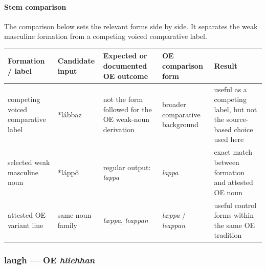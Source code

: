 \documentclass[
  british,
  a4paper,
]{article}
\newcounter{none} %
\begin{document}
\paragraph{Stem comparison}\label{stem-comparison-2}

The comparison below sets the relevant forms side by side. It separates
the weak masculine formation from a competing voiced comparative label.

{\def\LTcaptype{none} %
\begin{longtable}[]{@{}
  >{\raggedright\arraybackslash}p{}
  >{\raggedright\arraybackslash}p{}
  >{\raggedright\arraybackslash}p{}
  >{\raggedright\arraybackslash}p{}
  >{\raggedright\arraybackslash}p{}@{}}
\toprule\noalign{}
\begin{minipage}[b]{\linewidth}\raggedright
Formation / label
\end{minipage} & \begin{minipage}[b]{\linewidth}\raggedright
Candidate input
\end{minipage} & \begin{minipage}[b]{\linewidth}\raggedright
Expected or documented OE outcome
\end{minipage} & \begin{minipage}[b]{\linewidth}\raggedright
OE comparison form
\end{minipage} & \begin{minipage}[b]{\linewidth}\raggedright
Result
\end{minipage} \\
\midrule\noalign{}
\endhead
\bottomrule\noalign{}
\endlastfoot
competing voiced comparative label & *lábbaz & not the form followed for
the OE weak-noun derivation & broader comparative background & useful as
a competing label, but not the source-based choice used here \\
selected weak masculine noun & *láppô & regular output: \emph{lappa} &
\emph{lappa} & exact match between formation and attested OE noun \\
attested OE variant line & same noun family & \emph{læppa},
\emph{leappan} & \emph{læppa} / \emph{leappan} & useful control forms
within the same OE tradition \\
\end{longtable}
}

\subsubsection{\texorpdfstring{laugh --- OE
\emph{hliehhan}}{laugh --- OE hliehhan}}\label{laugh-oe-hliehhan}
\end{document}
